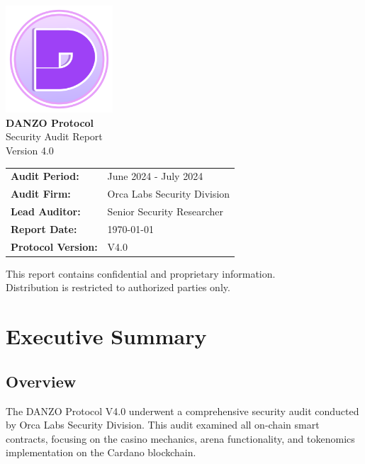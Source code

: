 \documentclass[11pt,a4paper]{article}
\begin{document}
\begin{titlepage}
    \centering
    \vspace*{2cm}
    
    \includegraphics[width=0.3\textwidth]{TokenLogo.png}\\[1cm]
    
    {\Huge\bfseries\color{danzoBlue} DANZO Protocol}\\[0.5cm]
    {\LARGE\color{danzoGray} Security Audit Report}\\[2cm]
    
    {\Large Version 4.0}\\[1cm]
    
    \begin{tabular}{ll}
        \textbf{Audit Period:} & June 2024 - July 2024 \\
        \textbf{Audit Firm:} & Orca Labs Security Division \\
        \textbf{Lead Auditor:} & Senior Security Researcher \\
        \textbf{Report Date:} & \today \\
        \textbf{Protocol Version:} & V4.0 \\
    \end{tabular}
    
    \vfill
    
    {\large\textcolor{danzoGray}{
        This report contains confidential and proprietary information.\\
        Distribution is restricted to authorized parties only.
    }}
    
\end{titlepage}

\tableofcontents
\newpage

\section{Executive Summary}

\subsection{Overview}
The DANZO Protocol V4.0 underwent a comprehensive security audit conducted by Orca Labs Security Division. This audit examined all on-chain smart contracts, focusing on the casino mechanics, arena functionality, and tokenomics implementation on the Cardano blockchain.
\end{document}
